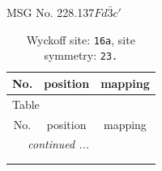 \documentclass[fleqn,8pt]{jsarticle}
\begin{document}
\setcounter{MaxMatrixCols}{32}

\renewcommand{\tablename}{Table~}
\renewcommand{\figurename}{Figure~}
\begin{center}
\LARGE
MSG No. 228.137\quad$Fd\bar{3}c'$
\end{center}
\renewcommand{\arraystretch}{1.2}
\begin{longtable}{ccc}
\caption{Wyckoff site: {\tt 16a}, site symmetry: {\tt 23.}}
 \\
 \hline \hline
No. & position & mapping \\ \hline \endfirsthead

\multicolumn{2}{l}{\tablename\ \thetable{}} \\
 \hline \hline
No. & position & mapping \\ \hline \endhead

 \hline \hline
\multicolumn{2}{r}{\footnotesize\it continued ...} \\ \endfoot

 \hline \hline
\multicolumn{2}{r}{} \\ \endlastfoot


\end{longtable}
\end{document}
